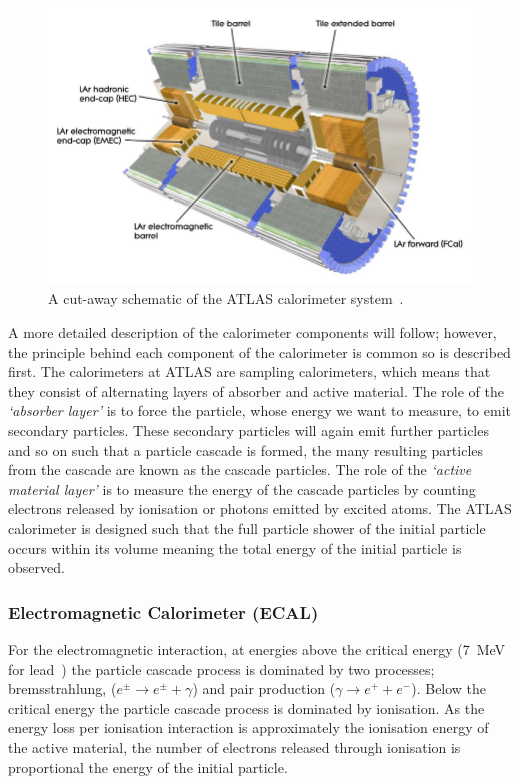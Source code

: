 \begin{figure}[!ht]
  \begin{center}
    \includegraphics[width=0.8\linewidth, angle=0]{figs/Detector/Calo_schem.png}
  \end{center}
  \caption[A cut-away schematic of the ATLAS calorimeter system.]
          {A cut-away schematic of the ATLAS calorimeter system~\cite{det-ATLAS_Exp}.}
  \label{fig:det-calo_schem}
\end{figure}

A more detailed description of the calorimeter components will follow;
however, the principle behind each component of the calorimeter is common so is described first.
The calorimeters at ATLAS are sampling calorimeters, which means that they consist of alternating layers of absorber and active material.
The role of the \textit{`absorber layer'} is to force the particle, whose energy we want to measure, to emit secondary particles.
These secondary particles will again emit further particles and so on such that a particle cascade is formed,
the many resulting particles from the cascade are known as the cascade particles.
The role of the \textit{`active material layer'} is to measure the energy of the cascade particles %
by counting electrons released by ionisation or photons emitted by excited atoms.
The ATLAS calorimeter is designed such that the full particle shower of the initial particle occurs within
its volume meaning the total energy of the initial particle is observed.

\subsubsection{Electromagnetic Calorimeter (ECAL)}

For the electromagnetic interaction, at energies above the critical energy (\SI{7}{\MeV} for lead~\cite{obj-bjets_PDG})
the particle cascade process is dominated by two processes;
bremsstrahlung, ($e^{\pm} \to e^{\pm} + \gamma$) and pair production ($\gamma \to e^{+} + e^{-}$).
Below the critical energy the particle cascade process is dominated by ionisation.
As the energy loss per ionisation interaction is approximately the ionisation energy of the active material,
the number of electrons released through ionisation is proportional the energy of the initial particle.

